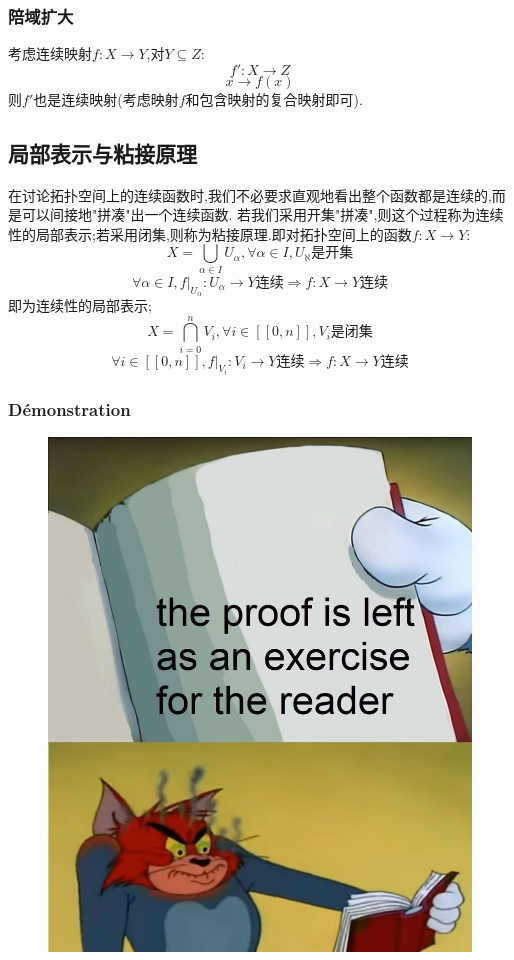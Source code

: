 \documentclass[12pt, a4paper, oneside]{ctexbook}
\begin{document}
  \subsubsection{陪域扩大}
  考虑连续映射$f:X\rightarrow Y$,对$Y\subseteq Z:$
  $$
    f': X\rightarrow Z
  $$
  $$
    x\rightarrow f(x)
  $$
  则$f'$也是连续映射(考虑映射$f$和包含映射的复合映射即可).
  \subsection{局部表示与粘接原理}
  在讨论拓扑空间上的连续函数时,我们不必要求直观地看出整个函数都是连续的,而是可以间接地"拼凑"出一个连续函数.
  若我们采用开集"拼凑",则这个过程称为连续性的局部表示;若采用闭集,则称为粘接原理.即对拓扑空间上的函数$f:X\rightarrow Y$:
  $$
    X=\bigcup_{\alpha\in I}U_\alpha ,\forall \alpha\in I, U_\aleph\text{是开集}
  $$
  $$
  \forall \alpha\in I,f|_{U_\alpha}:U_\alpha\rightarrow Y\text{连续}\Rightarrow f:X\rightarrow Y\text{连续}
  $$
  即为连续性的局部表示;
  $$
    X=\bigcap_{i=0}^{n}V_i ,\forall i\in[\![0,n]\!], V_i\text{是闭集}
  $$
  $$
    \forall i\in[\![0,n]\!],f|_{V_i}:V_i\rightarrow Y\text{连续}\Rightarrow f:X\rightarrow Y\text{连续}
  $$
  \subsubsection{Démonstration}
  \begin{figure}[H]%
    \centering
    \includegraphics[scale=0.2]{proofforreader.jpg}
  \end{figure}
\end{document}
